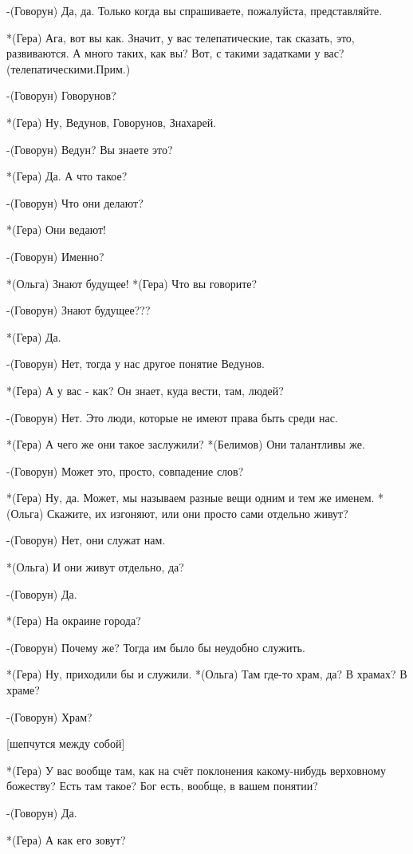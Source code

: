 -(Говорун) Да, да.  Только когда вы спрашиваете, пожалуйста, представляйте.

*(Гера) Ага, вот вы как. Значит, у вас телепатические, так сказать, это, развиваются. А много таких, как вы? Вот, с такими задатками у вас?(телепатическими.Прим.)

-(Говорун) Говорунов?

*(Гера) Ну, Ведунов, Говорунов, Знахарей.

-(Говорун) Ведун? Вы знаете это?

*(Гера) Да. А что такое?

-(Говорун) Что они делают?

*(Гера) Они ведают!

-(Говорун) Именно?

*(Ольга) Знают будущее!
*(Гера) Что вы говорите?

-(Говорун) Знают будущее???

*(Гера) Да.

-(Говорун) Нет, тогда у нас другое понятие Ведунов.

*(Гера) А у вас - как? Он знает, куда вести, там, людей?

-(Говорун) Нет. Это люди, которые не имеют права быть среди нас.

*(Гера) А чего же они такое заслужили?
*(Белимов) Они талантливы же.

-(Говорун) Может это, просто, совпадение слов?

*(Гера) Ну, да. Может, мы называем разные вещи одним и тем же именем.
*(Ольга) Скажите, их изгоняют, или они просто сами отдельно живут?

-(Говорун) Нет, они служат нам.

*(Ольга) И они живут отдельно, да?

-(Говорун) Да.

*(Гера) На окраине города? 

-(Говорун) Почему же? Тогда им было бы неудобно служить.

*(Гера) Ну, приходили бы и служили.
*(Ольга) Там где-то храм, да? В храмах? В храме?

-(Говорун) Храм?

[шепчутся между собой]

*(Гера) У вас вообще там, как на счёт поклонения какому-нибудь верховному божеству? Есть там такое? Бог есть, вообще, в вашем понятии? 

-(Говорун) Да.

*(Гера) А как его зовут?

